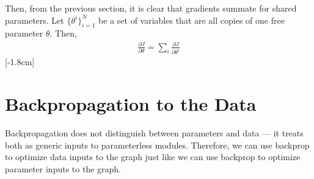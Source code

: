 Then, from the previous section, it is clear that gradients summate for shared parameters. Let $\{\theta^i\}^N_{i=1}$ be a set of variables that are all copies of one free parameter {\setlength{\fboxsep}{2pt}\colorbox{comp_graph_param_bcolor}{$\theta$}}. Then,
\begin{align}
    \frac{\partial J}{\partial \theta} = \sum_i \frac{\partial J}{\partial \theta^i}
\end{align}[-1.8cm]



\section{Backpropagation to the Data}

Backpropagation does not distinguish between parameters and data — it treats both as generic inputs to parameterless modules. Therefore, we can use backprop to optimize data inputs to the graph just like we can use backprop to optimize parameter inputs to the graph.

